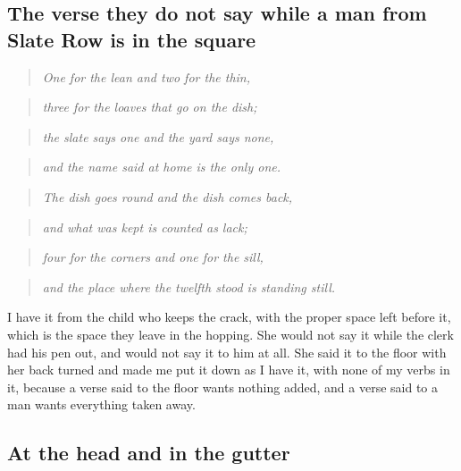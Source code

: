 \documentclass{design/chronicle}
\begin{document}
\subsection*{The verse they do not say while a man from Slate Row is in the square}

\begin{quote}\itshape One for the lean and two for the thin,\end{quote}

\begin{quote}\itshape three for the loaves that go on the dish;\end{quote}

\begin{quote}\itshape the slate says one and the yard says none,\end{quote}

\begin{quote}\itshape and the name said at home is the only one.\end{quote}

\begin{quote}\itshape \end{quote}

\begin{quote}\itshape The dish goes round and the dish comes back,\end{quote}

\begin{quote}\itshape and what was kept is counted as lack;\end{quote}

\begin{quote}\itshape four for the corners and one for the sill,\end{quote}

\begin{quote}\itshape and the place where the twelfth stood is standing still.\end{quote}

I have it from the child who keeps the crack, with the proper space left before it, which is the space they leave in the hopping. She would not say it while the clerk had his pen out, and would not say it to him at all. She said it to the floor with her back turned and made me put it down as I have it, with none of my verbs in it, because a verse said to the floor wants nothing added, and a verse said to a man wants everything taken away.

\subsection*{At the head and in the gutter}
\end{document}
